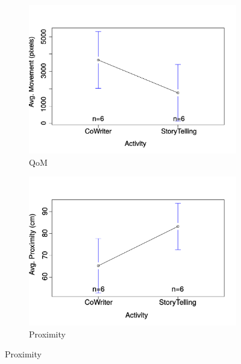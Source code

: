 \documentclass[a4paper, 10pt, conference]{ieeeconf}      %
\begin{document}
\begin{figure}
        \centering        
        \begin{subfigure}[b]{0.35\textwidth}
                \includegraphics[width=\textwidth]{../dissertation/figures/AvgMovement.pdf}
                \caption{QoM}
                \label{fig:meanMov}
        \end{subfigure}
        \begin{subfigure}[b]{0.35\textwidth}
                \includegraphics[width=\textwidth]{../dissertation/figures/AvgProximity.pdf} 
                \caption{Proximity}
                \label{fig:meanProx}
        \end{subfigure}%
        		

\end{figure}
\end{document}
